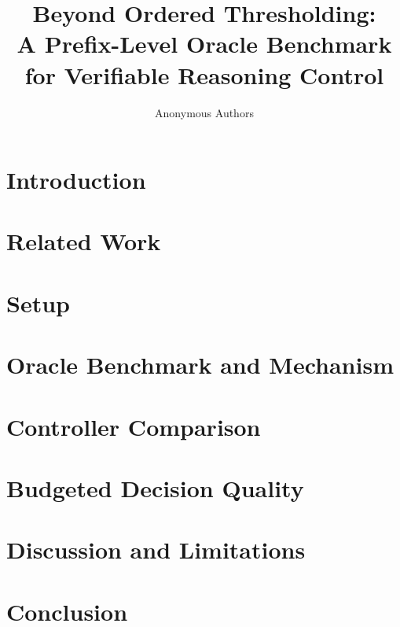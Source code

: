 \documentclass{article}
\title{Beyond Ordered Thresholding:\\ A Prefix-Level Oracle Benchmark for Verifiable Reasoning Control}
\author{Anonymous Authors}
\begin{document}
\maketitle



\section{Introduction}


\section{Related Work}
\label{sec:related}


\section{Setup}
\label{sec:setup}


\section{Oracle Benchmark and Mechanism}
\label{sec:benchmark}


\section{Controller Comparison}
\label{sec:controllers}


\section{Budgeted Decision Quality}
\label{sec:budget}


\section{Discussion and Limitations}
\label{sec:limitations}


\section{Conclusion}
\label{sec:conclusion}




\end{document}
